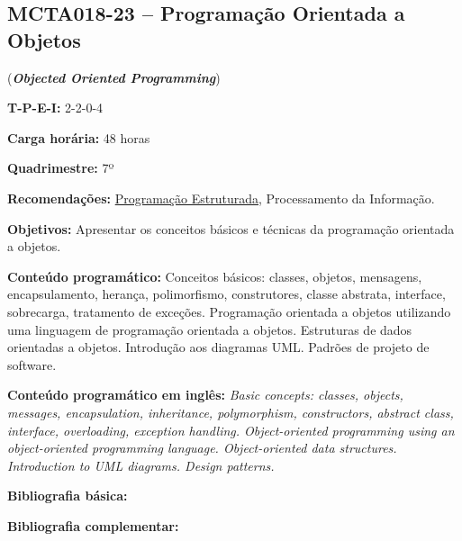 \documentclass[class=article, crop=false]{standalone}
\begin{document}
\subsection*{MCTA018-23 -- Programação Orientada a Objetos}
\label{disc:poo}

(\textbf{\textit{Objected Oriented Programming}})

\begin{center}
    \begin{minipage}{0.85\textwidth}
        \textbf{T-P-E-I:} 2-2-0-4
    
        \textbf{Carga horária:} 48 horas
        
        \textbf{Quadrimestre:} 7º
        
        \textbf{Recomendações:}
        \hyperref[disc:pe]{Programação Estruturada},
        Processamento da Informação.
    \end{minipage}
\end{center}

\textbf{Objetivos:}
Apresentar os conceitos básicos e técnicas da programação orientada a objetos.

\textbf{Conteúdo programático:}
Conceitos básicos: classes, objetos, mensagens, encapsulamento, herança,
polimorfismo, construtores, classe abstrata, interface, sobrecarga, tratamento
de exceções. 
Programação orientada a objetos utilizando uma linguagem de programação
orientada a objetos. 
Estruturas de dados orientadas a objetos. 
Introdução aos diagramas UML. 
Padrões de projeto de software.

\textbf{Conteúdo programático em inglês:}
\textit{Basic concepts: classes, objects, messages, encapsulation, inheritance,
polymorphism, constructors, abstract class, interface, overloading, exception handling.
Object-oriented programming using an object-oriented programming language.
Object-oriented data structures.
Introduction to UML diagrams.
Design patterns.}

\newrefsection
\textbf{Bibliografia básica:}
\nocite{2005-booch, 2007-larman, 2000-gamma}
\printbibliography

\newrefsection
\textbf{Bibliografia complementar:}
\nocite{2016-meyers, 2015-ramalho, 2010-silva, 2006-flanagan, 2009-guedes}
\printbibliography
\end{document}
